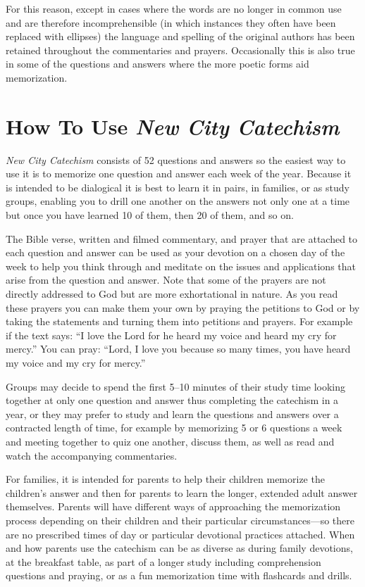 \documentclass[00-main.tex]{subfiles}
\begin{document}
For this reason, except in cases where the words are no longer in common use and are therefore incomprehensible (in which instances they often have been replaced with ellipses) the language and spelling of the original authors has been retained throughout the commentaries and prayers. Occasionally this is also true in some of the questions and answers where the more poetic forms aid memorization.


\section{How To Use \emph{New City Catechism}}
\emph{New City Catechism\/} consists of 52 questions and answers so the easiest way to use it is to memorize one question and answer each week of the year. Because it is intended to be dialogical it is best to learn it in pairs, in families, or as study groups, enabling you to drill one another on the answers not only one at a time but once you have learned 10 of them, then 20 of them, and so on.

The Bible verse, written and filmed commentary, and prayer that are attached to each question and answer can be used as your devotion on a chosen day of the week to help you think through and meditate on the issues and applications that arise from the question and answer. Note that some of the prayers are not directly addressed to God but are more exhortational in nature. As you read these prayers you can make them your own by praying the petitions to God or by taking the statements and turning them into petitions and prayers. For example if the text says: ``I love the Lord for he heard my voice and heard my cry for mercy.'' You can pray: ``Lord, I love you because so many times, you have heard my voice and my cry for mercy.''

Groups may decide to spend the first 5--10 minutes of their study time looking together at only one question and answer thus completing the catechism in a year, or they may prefer to study and learn the questions and answers over a contracted length of time, for example by memorizing 5 or 6 questions a week and meeting together to quiz one another, discuss them, as well as read and watch the accompanying commentaries.

For families, it is intended for parents to help their children memorize the children's answer and then for parents to learn the longer, extended adult answer themselves. Parents will have different ways of approaching the memorization process depending on their children and their particular circumstances\thinspace{}---\thinspace{}so there are no prescribed times of day or particular devotional practices attached. When and how parents use the catechism can be as diverse as during family devotions, at the breakfast table, as part of a longer study including comprehension questions and praying, or as a fun memorization time with flashcards and drills.
\end{document}
